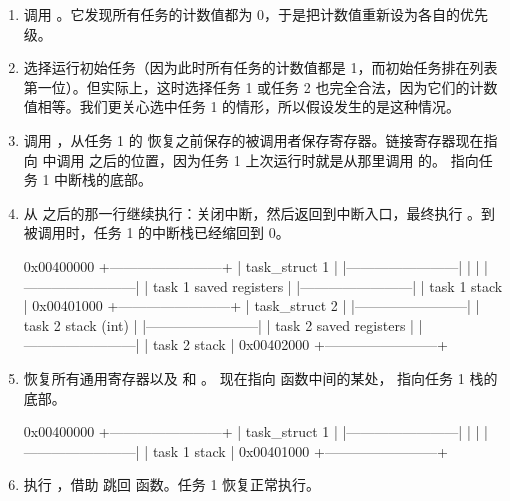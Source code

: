 \begin{enumerate}
\begin{txtcode}
0x00401000 +------------------------+
           | task_struct 2          |
           |------------------------|
           |                        |
           |------------------------|
           | task 2 stack (int)     |
           |------------------------|
           | task 2 saved registers |
           |------------------------|
           | task 2 stack           |
0x00402000 +------------------------+
\end{txtcode}
  \item 调用 。它发现所有任务的计数值都为 0，于是把计数值重新设为各自的优先级。
  \item {} 选择运行初始任务（因为此时所有任务的计数值都是 1，而初始任务排在列表第一位）。但实际上，这时选择任务 1 或任务 2 也完全合法，因为它们的计数值相等。我们更关心选中任务 1 的情形，所以假设发生的是这种情况。
  \item 调用 ，从任务 1 的  恢复之前保存的被调用者保存寄存器。链接寄存器现在指向  中调用  之后的位置，因为任务 1 上次运行时就是从那里调用  的。 指向任务 1 中断栈的底部。
  \item {} 从  之后的那一行继续执行：关闭中断，然后返回到中断入口，最终执行 。到  被调用时，任务 1 的中断栈已经缩回到 0。
\begin{txtcode}
0x00400000 +------------------------+
           | task_struct 1          |
           |------------------------|
           |                        |
           |------------------------|
           | task 1 saved registers |
           |------------------------|
           | task 1 stack           |
0x00401000 +------------------------+
           | task_struct 2          |
           |------------------------|
           | task 2 stack (int)     |
           |------------------------|
           | task 2 saved registers |
           |------------------------|
           | task 2 stack           |
0x00402000 +------------------------+
\end{txtcode}
  \item {} 恢复所有通用寄存器以及  和 。 现在指向  函数中间的某处， 指向任务 1 栈的底部。
\begin{txtcode}
0x00400000 +------------------------+
           | task_struct 1          |
           |------------------------|
           |                        |
           |------------------------|
           | task 1 stack           |
0x00401000 +------------------------+
\end{txtcode}
  \item {} 执行 ，借助  跳回  函数。任务 1 恢复正常执行。
\end{enumerate}


